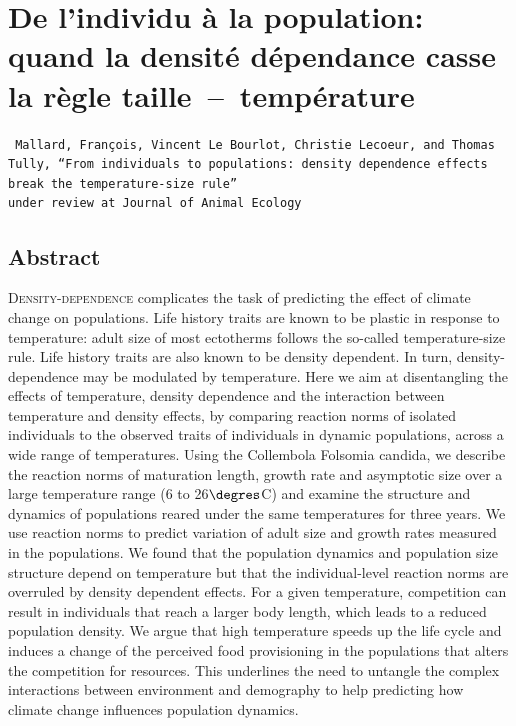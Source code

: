 \chapter[De l'individu à la population: quand la densité dépendense casse la
règle taille~--~température][Densité dépendance et température]{De l'individu à la population: quand la densité dépendance casse la
règle taille~--~température}
\label{Ann:fip}

\vspace{2cm}

\texttt{
Mallard, François, Vincent Le Bourlot, Christie Lecoeur, and Thomas Tully, ``From
individuals to populations:
density dependence effects break the temperature-size rule''\\
under review at Journal of Animal Ecology
}

\section*{Abstract}

\lettrine[lines=3]{D}{ensity-dependence} complicates the task of predicting the
effect of climate change on populations. Life history traits are known to be plastic in response
to temperature: adult size of most ectotherms follows the so-called
temperature-size rule. Life history traits are also known to be density
dependent. In turn, density-dependence may be modulated by temperature. Here we
aim at disentangling the effects of temperature, density dependence and the
interaction between temperature and density effects, by comparing reaction norms
of isolated individuals to the observed traits of individuals in dynamic
populations, across a wide range of temperatures. Using the Collembola Folsomia
candida, we describe the reaction norms of maturation length, growth rate and
asymptotic size over a large temperature range (6 to 26$\degres$C) and examine
the structure and dynamics of populations reared under the same temperatures for
three years. We use reaction norms to predict variation of adult size and growth
rates measured in the populations. We found that the population dynamics and
population size structure depend on temperature but that the individual-level
reaction norms are overruled by density dependent effects. For a given
temperature, competition can result in individuals that reach a larger body
length, which leads to a reduced population density. We argue that high
temperature speeds up the life cycle and induces a change of the perceived food
provisioning in the populations that alters the competition for resources. This
underlines the need to untangle the complex interactions between environment and
demography to help predicting how climate change influences population dynamics.

